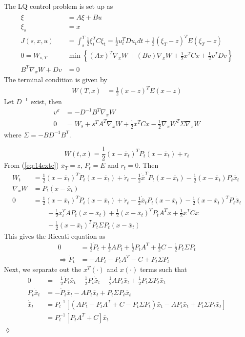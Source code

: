 \begin{example}
\label{ex:14lq}
The LQ control problem is set up as
\begin{align*}
\dot{\xi} &= A\xi+Bu \\
\xi_s &= x \\
J(s,x,u) &= \int_s^T\frac{1}{2}\xi_t^TC\xi_t = \frac{1}{2}u_t^TDu_tdt + \frac{1}{2}(\xi_T-z)^TE(\xi_T-z) \\
0 = W_{s,T} &\min\left\lbrace (Ax)^T\nabla_xW + (Bv)\nabla_xW + \frac{1}{2}x^TCx + \frac{1}{2}v^TDv \right\rbrace \\
B^T\nabla_xW + Dv &= 0
\end{align*}
The terminal condition is given by
\begin{align}
\label{eq:14extc}
W(T,x) &= \frac{1}{2}(x-z)^TE(x-z)
\end{align}
Let $D^{-1}$ exist, then
\begin{align*}
v^\sigma &= -D^{-1}B^T\nabla_xW \\
0 &= W_s+s^TA^T\nabla_xW + \frac{1}{2}x^TCx - \frac{1}{2}\nabla_xW^T\Sigma\nabla_xW
\end{align*}
where $\Sigma = -BD^{-1}B^T$.

$$W(t,x) = \frac{1}{2}(x-\bar{x}_t)^TP_t(x-\bar{x}_t) + r_t$$
From (\ref{eq:14extc}) $\bar{x}_T = z$, $P_t=E$ and $r_t=0$. Then
\begin{align*}
W_t &= \frac{1}{2}(x-\bar{x}_t)^T\dot{P}_t(x-\bar{x}_t)+\dot{r}_t - \frac{1}{2}\dot{\bar{x}}^TP_t(x-\bar{x}_t) - \frac{1}{2}(x-\bar{x}_t)P_t\dot{\bar{x}_t} \\
\nabla_xW &= P_t(x-\bar{x}_t) \\
0 &= \frac{1}{2}(x-\bar{x}_t)^T\dot{P}_t(x-\bar{x}_t) + \dot{r}_t - \frac{1}{2}\dot{\bar{x}}_tP_t(x-\bar{x}_t) - \frac{1}{2}(x-\bar{x}_t)^TP_t\dot{\bar{x}}_t \\
&\qquad + \frac{1}{2}x_t^TAP_t(x-\bar{x}_t) + \frac{1}{2}(x-\bar{x}_t)^TP_tA^Tx + \frac{1}{2}x^TCx \\
&\qquad - \frac{1}{2}(x-\bar{x}_t)^TP_t\Sigma P_t(x-\bar{x}_t)
\end{align*}
This gives the Riccati equation as
\begin{align*}
0 &= \frac{1}{2}\dot{P}_t + \frac{1}{2}AP_t + \frac{1}{2}P_tA^T + \frac{1}{2}C - \frac{1}{2}P_t\Sigma P_t \\
\Rightarrow \dot{P}_t &= -AP_t - P_tA^T - C + P_t\Sigma P_t
\end{align*}
Next, we separate out the $x^T(\cdot)$ and $x(\cdot)$ terms such that
\begin{align*}
0 &= -\frac{1}{2}\dot{P}_t\bar{x}_t - \frac{1}{2}P_t\dot{\bar{x}}_t - \frac{1}{2}AP_t\bar{x}_t + \frac{1}{2}P_t\Sigma P_t\bar{x}_t \\
P_t\dot{\bar{x}}_t &= -\dot{P}_t\bar{x}_t - AP_t\bar{x}_t + P_t\Sigma P_t\bar{x}_t \\
\dot{\bar{x}}_t &= P_t^{-1}\left[ (AP_t+P_tA^T+C-P_t\Sigma P_t)\bar{x}_t - AP_t\bar{x}_t + P_t\Sigma P_t\bar{x}_t \right] \\
&= P_t^{-1}\left[P_tA^T + C\right] \bar{x}_t
\end{align*}
$\lozenge$
\end{example}

